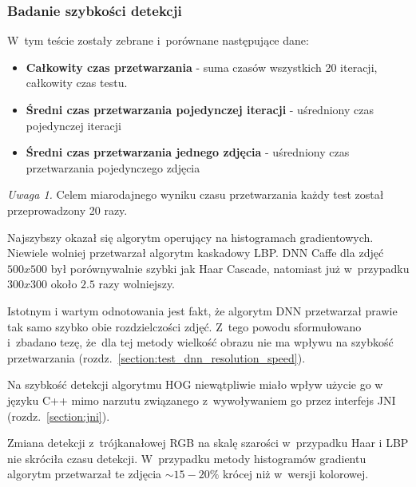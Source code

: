 \subsubsection{Badanie szybkości detekcji}

W~tym teście zostały zebrane i~porównane następujące dane:

\begin{itemize}
    \item \textbf{Całkowity czas przetwarzania} - suma czasów wszystkich 20 iteracji, całkowity czas testu.
    \item \textbf{Średni czas przetwarzania pojedynczej iteracji} - uśredniony czas pojedynczej iteracji
    \item \textbf{Średni czas przetwarzania jednego zdjęcia} - uśredniony czas przetwarzania pojedynczego zdjęcia
\end{itemize}

\par
\textit{Uwaga 1.}\label{uwaga:ilosc_powtorzen} Celem miarodajnego wyniku czasu przetwarzania każdy test został przeprowadzony 20 razy.

\vspace{10mm}




Najszybszy okazał się algorytm operujący na histogramach gradientowych. Niewiele wolniej przetwarzał algorytm kaskadowy LBP. DNN Caffe dla zdjęć $500x500$  był porównywalnie szybki jak Haar Cascade, natomiast już w~przypadku $300x300$ około $2.5$ razy wolniejszy.

\par

Istotnym i wartym odnotowania jest fakt, że algorytm DNN przetwarzał prawie tak samo szybko obie rozdzielczości zdjęć. Z~tego powodu sformułowano i~zbadano tezę, że~dla tej metody wielkość obrazu nie ma wpływu na szybkość przetwarzania (rozdz.~\ref{section:test_dnn_resolution_speed}).

\par

Na szybkość detekcji algorytmu HOG niewątpliwie miało wpływ użycie go w języku C++ mimo narzutu związanego z~wywoływaniem go przez interfejs JNI (rozdz.~\ref{section:jni}).

\vspace{5mm}

Zmiana detekcji z~trójkanałowej RGB na skalę szarości w~przypadku Haar i LBP nie skróciła czasu detekcji. W~przypadku metody histogramów gradientu algorytm przetwarzał te zdjęcia $\sim15-20 \%$ krócej niż w~wersji kolorowej.




